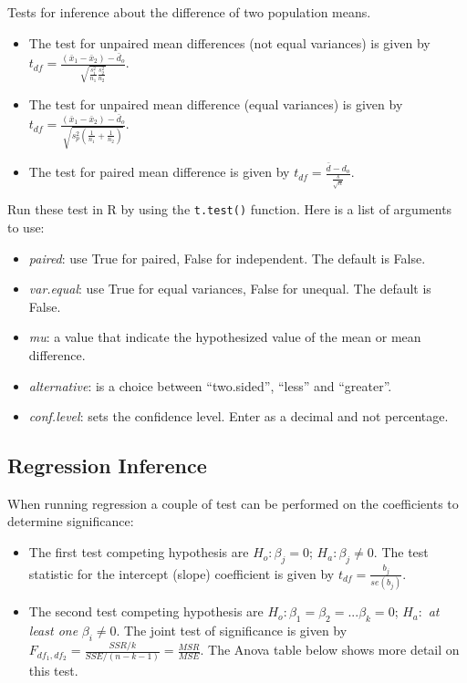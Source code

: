 \documentclass[
  letterpaper,
  DIV=11,
  numbers=noendperiod]{scrreprt}
\begin{document}
Tests for inference about the difference of two population means.

\begin{itemize}
\item
  The test for unpaired mean differences (not equal variances) is given
  by
  \(t_{df}= \frac {(\bar x_1 - \bar x_2)- \bar d_o}{\sqrt {\frac {s_1^2}{n_1} \frac{s_2^2}{n_2}}}\).
\item
  The test for unpaired mean difference (equal variances) is given by
  \(t_{df}= \frac {(\bar x_1 - \bar x_2)- \bar d_o}{\sqrt {s_p^2 (\frac {1}{n_1} + \frac {1}{n_2})}}\).
\item
  The test for paired mean difference is given by
  \(t_{df}= \frac {\bar d- d_o}{\frac {s}{\sqrt{n}}}\).
\end{itemize}

Run these test in R by using the \texttt{t.test()} function. Here is a
list of arguments to use:

\begin{itemize}
\item
  \emph{paired}: use True for paired, False for independent. The default
  is False.
\item
  \emph{var.equal}: use True for equal variances, False for unequal. The
  default is False.
\item
  \emph{mu}: a value that indicate the hypothesized value of the mean or
  mean difference.
\item
  \emph{alternative}: is a choice between ``two.sided'', ``less'' and
  ``greater''.
\item
  \emph{conf.level}: sets the confidence level. Enter as a decimal and
  not percentage.
\end{itemize}

\hypertarget{regression-inference}{%
\subsection*{Regression Inference}\label{regression-inference}}

When running regression a couple of test can be performed on the
coefficients to determine significance:

\begin{itemize}
\item
  The first test competing hypothesis are \(H_o: \beta_j = 0\);
  \(H_a: \beta_j \ne 0\). The test statistic for the intercept (slope)
  coefficient is given by \(t_{df}= \frac {b_j}{se(b_j)}\).
\item
  The second test competing hypothesis are
  \(H_o: \beta_1=\beta_2=...\beta_k=0\); \(H_a:\) \emph{at least one}
  \(\beta_i \neq 0\). The joint test of significance is given by
  \(F_{df_1,df_2} = \frac {SSR/k}{SSE/(n-k-1)} = \frac {MSR}{MSE}\). The
  Anova table below shows more detail on this test.
\end{itemize}
\end{document}
